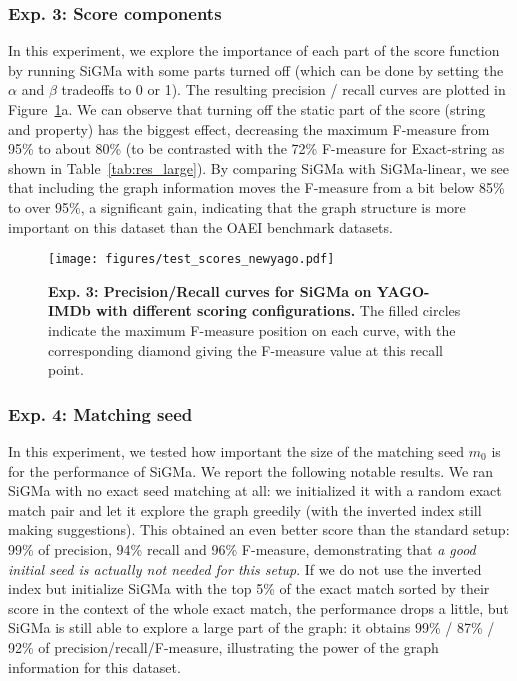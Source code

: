 \documentclass{sig-alternate}
\newcommand{\ts}[1]{\textsf{#1}}
\begin{document}
\subsubsection{Exp. 3: Score components}
In this experiment, we explore the importance of each part of the score function by running \ts{SiGMa} with some parts turned off (which can be done by setting the $\alpha$ and $\beta$ tradeoffs to 0 or 1). The resulting precision / recall curves are plotted in Figure~\ref{fig:test_scores}a. We can observe that turning off the static part of the score (string and property) has the biggest effect, decreasing the maximum F-measure from 95\% to about 80\% (to be contrasted with the 72\% F-measure for \ts{Exact-string} as shown in Table~\ref{tab:res_large}). By comparing \ts{SiGMa} with \textsf{SiGMa-linear}, we see that including the graph information moves the F-measure from a bit below 85\% to over 95\%, a significant gain, indicating that the graph structure is more important on this dataset than the OAEI benchmark datasets.
\begin{figure}
	\begin{center}
    \vspace*{-7mm}
    \texttt{[image: figures/test\_scores\_newyago.pdf]}
    \vspace*{-8mm}
    \end{center}
	\caption{\textbf{Exp. 3: Precision/Recall curves for \ts{SiGMa} on \ts{YAGO}-\ts{IMDb} with different scoring configurations.} \textnormal{The filled circles indicate the maximum F-measure position on each curve, with the corresponding diamond giving the F-measure value at this recall point.} \label{fig:test_scores} }
\end{figure}

\subsubsection{Exp. 4: Matching seed}
In this experiment, we tested how important the size of the matching seed $m_0$ is for the performance of \ts{SiGMa}. We report the following notable results. We ran \ts{SiGMa} with no exact seed matching at all: we initialized it with a random exact match pair and let it explore the graph greedily (with the inverted index still making suggestions). This obtained an even better score than the standard setup: 99\% of precision, 94\% recall and 96\% F-measure, demonstrating that \emph{a good initial seed is actually not needed for this setup}. If we do not use the inverted index but initialize \ts{SiGMa} with the top 5\% of the exact match sorted by their score in the context of the whole exact match, the performance drops a little, but \ts{SiGMa} is still able to explore a large part of the graph: it obtains 99\% / 87\% / 92\% of precision/recall/F-measure, illustrating the power of the graph information for this dataset.
\end{document}
